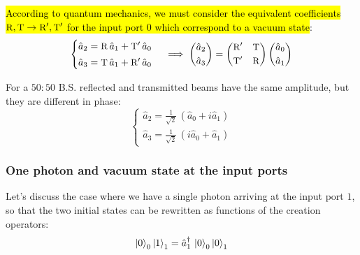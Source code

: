 \hl{According to quantum mechanics, we must consider the equivalent coefficients $\textsc{\small{R}},\textsc{\small{T}} \to \textsc{\small{R}}',\textsc{\small{T}}'$ for the input port $0$ which correspond to a vacuum state}:
\begin{equation}\label{eqn:16-quantum-b-s}
\begin{cases}
    \hat{a}_2 = \textsc{\small{R}}\,\hat{a}_1+\textsc{\small{T}}'\,\hat{a}_0\\[0.5ex]
    \hat{a}_3 = \textsc{\small{T}}\, \hat{a}_1+\textsc{\small{R}}'\, \hat{a}_0
\end{cases}\implies \begin{pmatrix}
    \hat{a}_2\\[0.5ex]
    \hat{a}_3
\end{pmatrix} = \begin{pmatrix}
    \textsc{\small{R}}' &\textsc{\small{T}}\\[0.5ex]
    \textsc{\small{T}}' &\textsc{\small{R}}
\end{pmatrix}\begin{pmatrix}
    \hat{a}_0\\[0.5ex]
    \hat{a}_1
    \end{pmatrix}
\end{equation}

For a $50:50$ B.S. reflected and transmitted beams have the same amplitude, but they are different in phase:
\begin{equation}\label{eqn:16-50-50-b-s-phase}
\begin{cases}
    \hat{a}_2= \frac{1}{\sqrt{2}}\, 
    \left( \hat{a}_0+i\hat{a}_1\right)\\[0.5ex]
    \hat{a}_3= \frac{1}{\sqrt{2}}\, 
    \left( i\hat{a}_0+\hat{a}_1\right)
\end{cases}
\end{equation}

\subsubsection{One photon and vacuum state at the input ports}

Let's discuss the case where we have a single photon arriving at the input port $1$, so that the two initial states can be rewritten as functions of the creation operators:
\begin{equation}\label{eqn:16-single-photon-state}
\ket{0}_0\ket{1}_1 = \hat{a}_1^\dagger \, \ket{0}_0\ket{0}_1
\end{equation}

